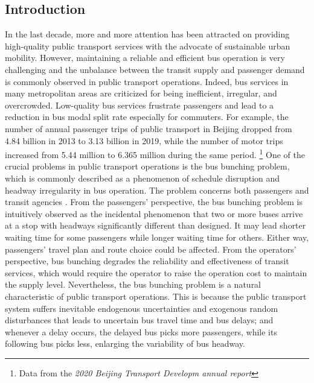 \documentclass[smallextended]{svjour3}       %
\begin{document}
\begin{Abstract}
\section{Introduction}
\label{intro}
In the last decade, more and more attention has been attracted on providing high-quality public transport services with the advocate of sustainable urban mobility.
However, maintaining a reliable and efficient bus operation is very challenging and the unbalance between the transit supply and passenger demand is commonly observed in public transport operations.
Indeed, bus services in many metropolitan areas are criticized for being inefficient, irregular, and overcrowded.
Low-quality bus services frustrate passengers and lead to a reduction in bus modal split rate especially for commuters.
For example, the number of annual passenger trips of public transport in Beijing dropped from 4.84 billion in 2013 to 3.13 billion in 2019, while the number of motor trips increased from 5.44 million to 6.365 million during the same period.
\footnote[1]{Data from the \textit{2020 Beijing Transport Developm annual report}}
One of the crucial problems in public transport operations is the bus bunching problem, which is commonly described as a phenomenon of schedule disruption and headway irregularity in bus operation.
The problem concerns both passengers and transit agencies \citep{1964Nwell,1972Osuna,2008Hollander,2016Verbich}.
From the passengers' perspective, the bus bunching problem is intuitively observed as the incidental phenomenon that 
two or more buses arrive at a stop with headways significantly different than designed. 
It may lead shorter waiting time for some passengers while longer waiting time for others. 
Either way, passengers' travel plan and route choice could be affected. 
From the operators' perspective, bus bunching degrades the reliability and effectiveness of transit services, which would require the operator to raise the operation cost to maintain the supply level. 
Nevertheless, the bus bunching problem is a natural characteristic of public transport operations. This is because the public transport system suffers inevitable endogenous uncertainties and exogenous random disturbances that leads to uncertain bus travel time and bus delays; and whenever a delay occurs, the delayed bus picks more passengers, while its following bus picks less, enlarging the variability of bus headway. 

\end{Abstract}
\end{document}
